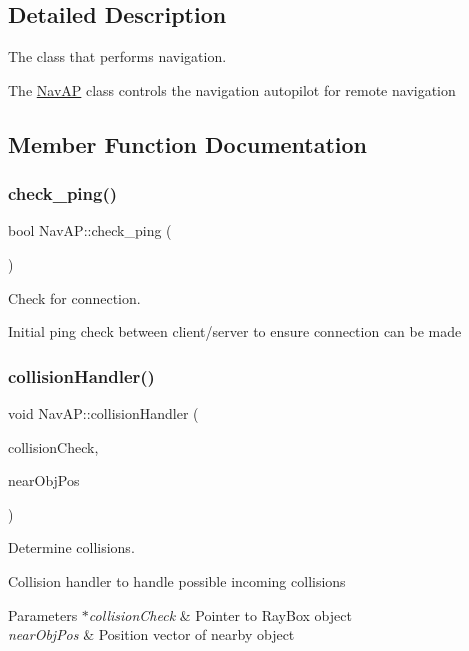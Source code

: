 \subsection{Detailed Description}
The class that performs navigation. 

The \mbox{\hyperlink{classNavAP}{Nav\+AP}} class controls the navigation autopilot for remote navigation 

\subsection{Member Function Documentation}
\mbox{\label{classNavAP_af3df468aafedfd4237c65cf456fed706}} 
\subsubsection{\texorpdfstring{check\+\_\+ping()}{check\_ping()}}
{\footnotesize\ttfamily bool Nav\+A\+P\+::check\+\_\+ping (\begin{DoxyParamCaption}{ }\end{DoxyParamCaption})}



Check for connection. 

Initial ping check between client/server to ensure connection can be made \mbox{\label{classNavAP_a092a772bdb4058bb4903f1e5d14e8287}} 
\subsubsection{\texorpdfstring{collision\+Handler()}{collisionHandler()}}
{\footnotesize\ttfamily void Nav\+A\+P\+::collision\+Handler (\begin{DoxyParamCaption}\item[{Ray\+Box $\ast$}]{collision\+Check,  }\item[{v3}]{near\+Obj\+Pos }\end{DoxyParamCaption})\hspace{0.3cm}{\ttfamily [private]}}



Determine collisions. 

Collision handler to handle possible incoming collisions 
\begin{DoxyParams}{Parameters}
{\em $\ast$collision\+Check} & Pointer to Ray\+Box object \\
\hline
{\em near\+Obj\+Pos} & Position vector of nearby object \\
\hline
\end{DoxyParams}
\mbox{\label{classNavAP_a13408e123d8040a572f03a7b3d363b54}} 
